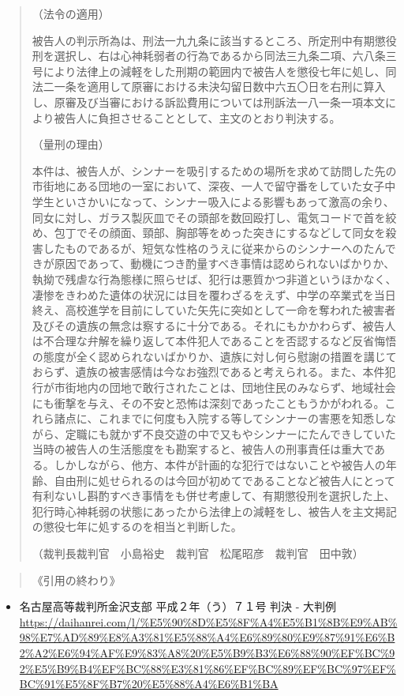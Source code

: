 \documentclass[
]{ltjarticle}
\providecommand{\tightlist}{%
  \setlength{\itemsep}{0pt}\setlength{\parskip}{0pt}}
\begin{document}
\begin{quote}
（法令の適用）

被告人の判示所為は、刑法一九九条に該当するところ、所定刑中有期懲役刑を選択し、右は心神耗弱者の行為であるから同法三九条二項、六八条三号により法律上の減軽をした刑期の範囲内で被告人を懲役七年に処し、同法二一条を適用して原審における未決勾留日数中六五〇日を右刑に算入し、原審及び当審における訴訟費用については刑訴法一八一条一項本文により被告人に負担させることとして、主文のとおり判決する。

（量刑の理由）

本件は、被告人が、シンナーを吸引するための場所を求めて訪問した先の市街地にある団地の一室において、深夜、一人で留守番をしていた女子中学生といさかいになって、シンナー吸入による影響もあって激高の余り、同女に対し、ガラス製灰皿でその頭部を数回殴打し、電気コードで首を絞め、包丁でその顔面、頸部、胸部等をめった突きにするなどして同女を殺害したものであるが、短気な性格のうえに従来からのシンナーへのたんできが原因であって、動機につき酌量すべき事情は認められないばかりか、執拗で残虐な行為態様に照らせば、犯行は悪質かつ非道というほかなく、凄惨をきわめた遺体の状況には目を覆わざるをえず、中学の卒業式を当日終え、高校進学を目前にしていた矢先に突如として一命を奪われた被害者及びその遺族の無念は察するに十分である。それにもかかわらず、被告人は不合理な弁解を繰り返して本件犯人であることを否認するなど反省悔悟の態度が全く認められないばかりか、遺族に対し何ら慰謝の措置を講じておらず、遺族の被害感情は今なお強烈であると考えられる。また、本件犯行が市街地内の団地で敢行されたことは、団地住民のみならず、地域社会にも衝撃を与え、その不安と恐怖は深刻であったこともうかがわれる。これら諸点に、これまでに何度も入院する等してシンナーの害悪を知悉しながら、定職にも就かず不良交遊の中で又もやシンナーにたんできしていた当時の被告人の生活態度をも勘案すると、被告人の刑事責任は重大である。しかしながら、他方、本件が計画的な犯行ではないことや被告人の年齢、自由刑に処せられるのは今回が初めてであることなど被告人にとって有利ないし斟酌すべき事情をも併せ考慮して、有期懲役刑を選択した上、犯行時心神耗弱の状態にあったから法律上の減軽をし、被告人を主文掲記の懲役七年に処するのを相当と判断した。

（裁判長裁判官　小島裕史　裁判官　松尾昭彦　裁判官　田中敦）
\end{quote}

\begin{quote}
《引用の終わり》
\end{quote}

\begin{itemize}
\tightlist
\item
  名古屋高等裁判所金沢支部 平成２年（う）７１号 判決 - 大判例
  \url{https://daihanrei.com/l/\%E5\%90\%8D\%E5\%8F\%A4\%E5\%B1\%8B\%E9\%AB\%98\%E7\%AD\%89\%E8\%A3\%81\%E5\%88\%A4\%E6\%89\%80\%E9\%87\%91\%E6\%B2\%A2\%E6\%94\%AF\%E9\%83\%A8\%20\%E5\%B9\%B3\%E6\%88\%90\%EF\%BC\%92\%E5\%B9\%B4\%EF\%BC\%88\%E3\%81\%86\%EF\%BC\%89\%EF\%BC\%97\%EF\%BC\%91\%E5\%8F\%B7\%20\%E5\%88\%A4\%E6\%B1\%BA} 
\end{itemize}
\end{document}
